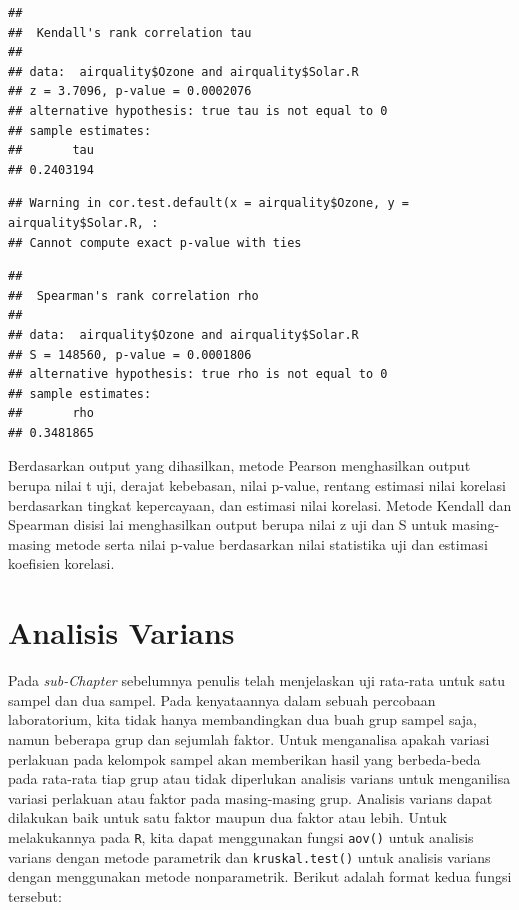 \documentclass[]{book}
\newenvironment{Shaded}{\begin{snugshade}}{\end{snugshade}}
\newcommand{\CommentTok}[1]{\textcolor[rgb]{0.56,0.35,0.01}{\textit{#1}}}
\newcommand{\DataTypeTok}[1]{\textcolor[rgb]{0.13,0.29,0.53}{#1}}
\newcommand{\KeywordTok}[1]{\textcolor[rgb]{0.13,0.29,0.53}{\textbf{#1}}}
\newcommand{\NormalTok}[1]{#1}
\newcommand{\OperatorTok}[1]{\textcolor[rgb]{0.81,0.36,0.00}{\textbf{#1}}}
\newcommand{\StringTok}[1]{\textcolor[rgb]{0.31,0.60,0.02}{#1}}
\theoremstyle{definition}
\theoremstyle{definition}
\theoremstyle{definition}
\theoremstyle{remark}
\begin{document}
\begin{verbatim}
## 
##  Kendall's rank correlation tau
## 
## data:  airquality$Ozone and airquality$Solar.R
## z = 3.7096, p-value = 0.0002076
## alternative hypothesis: true tau is not equal to 0
## sample estimates:
##       tau 
## 0.2403194
\end{verbatim}

\begin{Shaded}
\end{Shaded}

\begin{verbatim}
## Warning in cor.test.default(x = airquality$Ozone, y = airquality$Solar.R, :
## Cannot compute exact p-value with ties
\end{verbatim}

\begin{verbatim}
## 
##  Spearman's rank correlation rho
## 
## data:  airquality$Ozone and airquality$Solar.R
## S = 148560, p-value = 0.0001806
## alternative hypothesis: true rho is not equal to 0
## sample estimates:
##       rho 
## 0.3481865
\end{verbatim}

Berdasarkan output yang dihasilkan, metode Pearson menghasilkan output berupa nilai t uji, derajat kebebasan, nilai p-value, rentang estimasi nilai korelasi berdasarkan tingkat kepercayaan, dan estimasi nilai korelasi. Metode Kendall dan Spearman disisi lai menghasilkan output berupa nilai z uji dan S untuk masing-masing metode serta nilai p-value berdasarkan nilai statistika uji dan estimasi koefisien korelasi.

\hypertarget{analisis-varians}{%
\section{Analisis Varians}\label{analisis-varians}}

Pada \emph{sub-Chapter} sebelumnya penulis telah menjelaskan uji rata-rata untuk satu sampel dan dua sampel. Pada kenyataannya dalam sebuah percobaan laboratorium, kita tidak hanya membandingkan dua buah grup sampel saja, namun beberapa grup dan sejumlah faktor. Untuk menganalisa apakah variasi perlakuan pada kelompok sampel akan memberikan hasil yang berbeda-beda pada rata-rata tiap grup atau tidak diperlukan analisis varians untuk menganilisa variasi perlakuan atau faktor pada masing-masing grup. Analisis varians dapat dilakukan baik untuk satu faktor maupun dua faktor atau lebih. Untuk melakukannya pada \texttt{R}, kita dapat menggunakan fungsi \texttt{aov()} untuk analisis varians dengan metode parametrik dan \texttt{kruskal.test()} untuk analisis varians dengan menggunakan metode nonparametrik. Berikut adalah format kedua fungsi tersebut:
\end{document}

